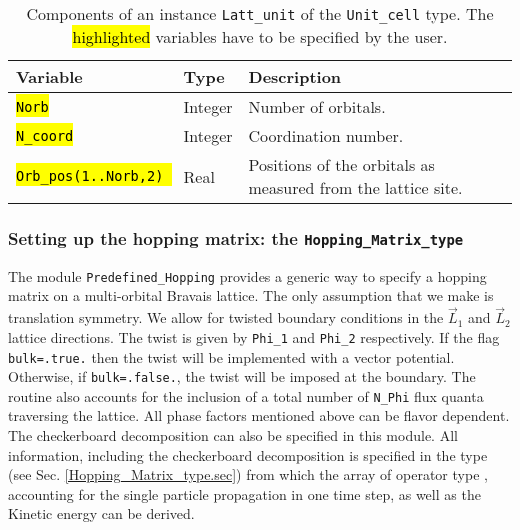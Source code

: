 \begin{table}[h]
	\begin{center}
   \begin{tabular}{@{} l l l @{}}\toprule
    Variable  & Type & Description \\\midrule
     \hl{\texttt{Norb}}   & Integer    & Number of orbitals.  \\
      \hl{\texttt{N\_coord}} & Integer & Coordination number.  \\
       \hl{\texttt{Orb\_pos(1..Norb,2) }} & Real & Positions of the orbitals as measured from the lattice site.  \\\bottomrule
   \end{tabular}
     \caption{Components of an instance \texttt{Latt\_unit} of the \texttt{Unit\_cell} type.
   The \hl{highlighted} variables have to be specified by the user. } 
    \label{table:unit_cell}
\end{center}
\end{table}


\subsubsection{Setting up the hopping matrix: the \texttt{Hopping\_Matrix\_type}}

The module \texttt{Predefined\_Hopping}   provides a   generic way to   specify a  hopping matrix on a  multi-orbital   Bravais lattice.  The only  assumption that we make is  translation symmetry.   We   allow  for twisted  boundary conditions in the $\vec{L}_1$ and $\vec{L}_2$ lattice directions. The twist is given by  \texttt{Phi\_1}  and \texttt{Phi\_2}  respectively.  If the flag  \texttt{bulk=.true.}   then   the twist will be implemented with a vector potential. Otherwise, if  \texttt{bulk=.false.}, the twist will be imposed at the boundary. The routine also accounts for  the inclusion of a  total number of \texttt{N\_Phi}  flux quanta traversing the lattice.  All phase factors mentioned above can be flavor dependent.   The checkerboard decomposition can also be specified in this module.      All information, including the checkerboard decomposition is specified in the     type (see Sec. \ref{Hopping_Matrix_type.sec}) from which  the array of  operator type ,   accounting for the single particle propagation in one time step,  as well as the Kinetic energy can be derived.    

